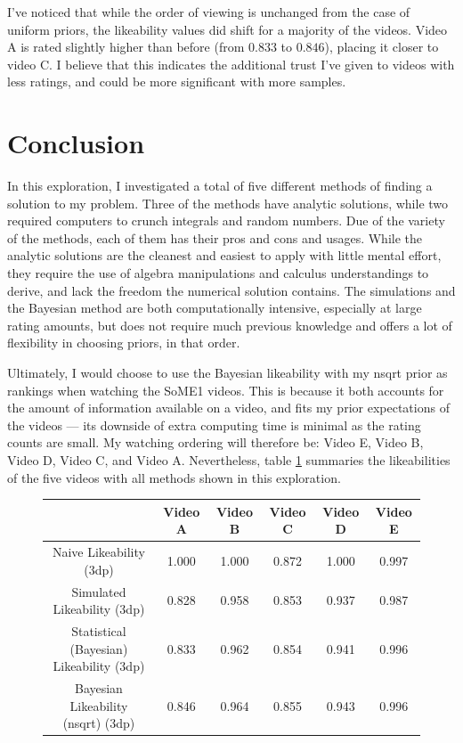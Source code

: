 \documentclass[a4paper,11pt]{article}
\begin{document}
I've noticed that while the order of viewing is unchanged from the case of uniform priors, the likeability values did shift for a majority of the videos. Video A is rated slightly higher than before (from $0.833$ to $0.846$), placing it closer to video C. I believe that this indicates the additional trust I've given to videos with less ratings, and could be more significant with more samples.

\section{Conclusion}
In this exploration, I investigated a total of five different methods of finding a solution to my problem. Three of the methods have analytic solutions, while two required computers to crunch integrals and random numbers. Due of the variety of the methods, each of them has their pros and cons and usages. While the analytic solutions are the cleanest and easiest to apply with little mental effort, they require the use of algebra manipulations and calculus understandings to derive, and lack the freedom the numerical solution contains. The simulations and the Bayesian method are both computationally intensive, especially at large rating amounts, but does not require much previous knowledge and offers a lot of flexibility in choosing priors, in that order.

Ultimately, I would choose to use the Bayesian likeability with my nsqrt prior as rankings when watching the SoME1 videos. This is because it both accounts for the amount of information available on a video, and fits my prior expectations of the videos --- its downside of extra computing time is minimal as the rating counts are small. My watching ordering will therefore be: Video E, Video B, Video D, Video C, and Video A. Nevertheless, table \ref{tbl:all}  summaries the likeabilities of the five videos with all methods shown in this exploration.

\begin{figure}[H]
    \centering
    \begin{tabular}{c|c|c|c|c|c}
        & Video A & Video B & Video C & Video D & Video E \\
        \hline
        \hline
         Naive Likeability (3dp) & 1.000 & 1.000 & 0.872 & 1.000 & 0.997\\ \hline
         Simulated Likeability (3dp) & 0.828 & 0.958 &  0.853 & 0.937 & 0.987\\ \hline
         Statistical (Bayesian) Likeability (3dp) & 0.833 & 0.962 & 0.854 & 0.941 & 0.996\\ \hline
        Bayesian Likeability (nsqrt) (3dp) & 0.846 & 0.964 & 0.855 & 0.943 & 0.996
    \end{tabular}
    \label{tbl:all}
\end{figure}
\end{document}
